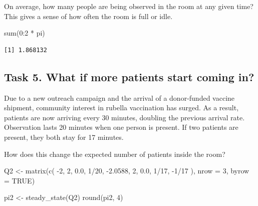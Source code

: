 \documentclass[
]{article}
\newenvironment{Shaded}{\begin{snugshade}}{\end{snugshade}}
\newcommand{\AttributeTok}[1]{\textcolor[rgb]{0.40,0.45,0.13}{#1}}
\newcommand{\ConstantTok}[1]{\textcolor[rgb]{0.56,0.35,0.01}{#1}}
\newcommand{\DecValTok}[1]{\textcolor[rgb]{0.68,0.00,0.00}{#1}}
\newcommand{\FloatTok}[1]{\textcolor[rgb]{0.68,0.00,0.00}{#1}}
\newcommand{\FunctionTok}[1]{\textcolor[rgb]{0.28,0.35,0.67}{#1}}
\newcommand{\NormalTok}[1]{\textcolor[rgb]{0.00,0.23,0.31}{#1}}
\newcommand{\OtherTok}[1]{\textcolor[rgb]{0.00,0.23,0.31}{#1}}
\newcommand{\SpecialCharTok}[1]{\textcolor[rgb]{0.37,0.37,0.37}{#1}}
\begin{document}
On average, how many people are being observed in the room at any given
time? This gives a sense of how often the room is full or idle.

\begin{Shaded}
\begin{Highlighting}[]
\FunctionTok{sum}\NormalTok{(}\DecValTok{0}\SpecialCharTok{:}\DecValTok{2} \SpecialCharTok{*}\NormalTok{ pi)}
\end{Highlighting}
\end{Shaded}

\begin{verbatim}
[1] 1.868132
\end{verbatim}

\subsection{Task 5. What if more patients start coming
in?}\label{task-5.-what-if-more-patients-start-coming-in}

Due to a new outreach campaign and the arrival of a donor-funded vaccine
shipment, community interest in rubella vaccination has surged. As a
result, patients are now arriving every 30 minutes, doubling the
previous arrival rate. Observation lasts 20 minutes when one person is
present. If two patients are present, they both stay for 17 minutes.

How does this change the expected number of patients inside the room?

\begin{Shaded}
\begin{Highlighting}[]
\NormalTok{Q2 }\OtherTok{\textless{}{-}} \FunctionTok{matrix}\NormalTok{(}\FunctionTok{c}\NormalTok{(}
  \SpecialCharTok{{-}}\DecValTok{2}\NormalTok{, }\DecValTok{2}\NormalTok{, }\FloatTok{0.0}\NormalTok{,}
   \DecValTok{1}\SpecialCharTok{/}\DecValTok{20}\NormalTok{, }\SpecialCharTok{{-}}\FloatTok{2.0588}\NormalTok{, }\DecValTok{2}\NormalTok{,}
   \FloatTok{0.0}\NormalTok{, }\DecValTok{1}\SpecialCharTok{/}\DecValTok{17}\NormalTok{, }\SpecialCharTok{{-}}\DecValTok{1}\SpecialCharTok{/}\DecValTok{17}
\NormalTok{), }\AttributeTok{nrow =} \DecValTok{3}\NormalTok{, }\AttributeTok{byrow =} \ConstantTok{TRUE}\NormalTok{)}

\NormalTok{pi2 }\OtherTok{\textless{}{-}} \FunctionTok{steady\_state}\NormalTok{(Q2)}
\FunctionTok{round}\NormalTok{(pi2, }\DecValTok{4}\NormalTok{)}
\end{Highlighting}
\end{Shaded}
\end{document}
